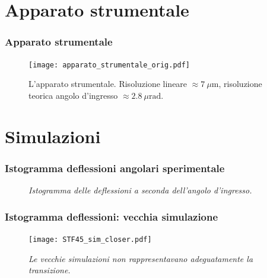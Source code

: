 \documentclass[10pt]{beamer}
\begin{document}
\section{Apparato strumentale} 

\begin{frame}
\frametitle{Apparato strumentale}
\begin{figure}
\texttt{[image: apparato\_strumentale\_orig.pdf]}
\caption{L'apparato strumentale. Risoluzione lineare $\approx 7\ \mu\textrm{m}$, risoluzione teorica angolo d'ingresso $\approx 2.8\ \mu\textrm{rad}$.}
\end{figure}
\end{frame}




\section{Simulazioni} 

\begin{frame}
\frametitle{Istogramma deflessioni angolari sperimentale}
\begin{figure}
\caption{\footnotesize \itshape
Istogramma delle deflessioni a seconda dell'angolo d'ingresso.
}
\end{figure}
\end{frame}


\begin{frame}
\frametitle{Istogramma deflessioni: vecchia simulazione}
\begin{figure}
\texttt{[image: STF45\_sim\_closer.pdf]}
\caption{\footnotesize \itshape Le vecchie simulazioni non rappresentavano adeguatamente la transizione.}
\end{figure}%
\end{frame}
\end{document}
